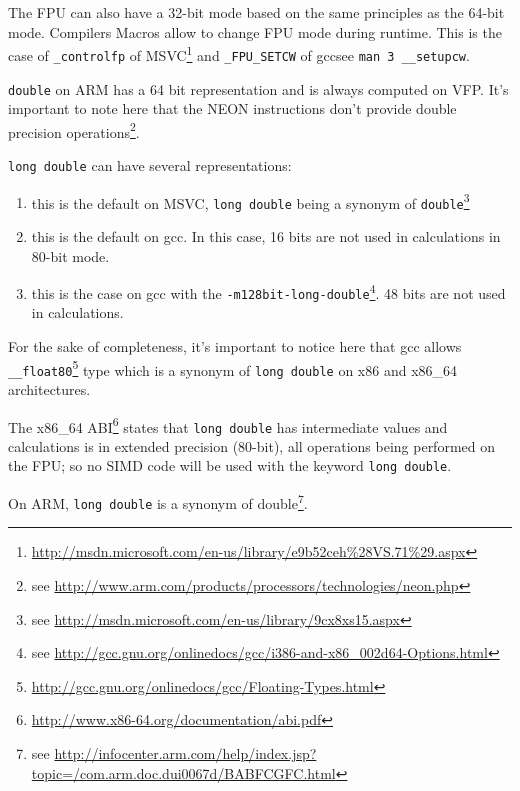The FPU can also have a 32-bit mode based on the same principles as the 64-bit mode. Compilers Macros allow to change FPU mode during runtime. This is the case of \texttt{\_controlfp} of MSVC\footnote{\url{http://msdn.microsoft.com/en-us/library/e9b52ceh\%28VS.71\%29.aspx}} and \texttt{\_FPU\_SETCW} of gcc{see \texttt{man 3 \_\_setupcw}}.

\texttt{double} on ARM has a 64 bit representation and is always computed on VFP. It's important to note here that the NEON instructions don't provide double precision operations\footnote{see \url{http://www.arm.com/products/processors/technologies/neon.php}}.


\texttt{long double} can have several representations:
\begin{enumerate}
\item[\enumstyle{64-bit}] this is the default on MSVC, \texttt{long double} being a synonym of \texttt{double}\footnote{see \url{http://msdn.microsoft.com/en-us/library/9cx8xs15.aspx}}
\item[\enumstyle{96-bit}] this is the default on gcc. In this case, 16 bits are not used in calculations in 80-bit mode.
\item[\enumstyle{128-bit}] this is the case on gcc with the \texttt{-m128bit-long-double}\footnote{see \url{http://gcc.gnu.org/onlinedocs/gcc/i386-and-x86\_002d64-Options.html}}. 48 bits are not used in calculations.
\end{enumerate}

For the sake of completeness, it's important to notice here that gcc allows \texttt{\_\_float80}\footnote{\url{http://gcc.gnu.org/onlinedocs/gcc/Floating-Types.html}} type which is a synonym of \texttt{long double} on x86 and x86\_64 architectures.


The x86\_64 ABI\footnote{\url{http://www.x86-64.org/documentation/abi.pdf}} states that \texttt{long double} has intermediate values and calculations is in extended precision (80-bit), all operations being performed on the FPU; so no SIMD code will be used with the keyword \texttt{long double}.

On ARM, \texttt{long double} is a synonym of double\footnote{see \url{http://infocenter.arm.com/help/index.jsp?topic=/com.arm.doc.dui0067d/BABFCGFC.html}}.


